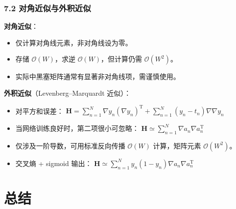 \documentclass[t,aspectratio=169]{beamer} %
\begin{document}
\begin{frame}
    \frametitle{7.2 对角近似与外积近似}
    \textbf{对角近似}：
    \begin{itemize}
        \item 仅计算对角线元素，非对角线设为零。
        \item 存储 $\mathcal{O}(W)$，求逆 $\mathcal{O}(W)$，但计算仍需 $\mathcal{O}(W^2)$。
        \item 实际中黑塞矩阵通常有显著非对角线项，需谨慎使用。
    \end{itemize}
    \textbf{外积近似}（Levenberg--Marquardt 近似）：
    \begin{itemize}
        \item 对平方和误差：
        $\displaystyle %
            \mathbf{H} = \sum_{n=1}^N \nabla y_n (\nabla y_n)^\mathrm{T} + \sum_{n=1}^N (y_n - t_n) \nabla \nabla y_n
        $%
        \item 当网络训练良好时，第二项很小可忽略：
        $\displaystyle %
            \mathbf{H} \simeq \sum_{n=1}^N \nabla a_n \nabla a_n^\mathrm{T}
        $%
        \item 仅涉及一阶导数，可用标准反向传播 $\mathcal{O}(W)$ 计算，矩阵元素 $\mathcal{O}(W^2)$。
        \item 交叉熵 + sigmoid 输出：
        $\displaystyle %
            \mathbf{H} \simeq \sum_{n=1}^N y_n (1 - y_n) \nabla a_n \nabla a_n^\mathrm{T}
        $%
    \end{itemize}
\end{frame}

\section{总结}
\end{document}
